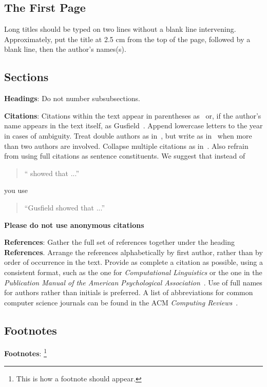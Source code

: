 \documentclass[11pt]{article}
\begin{document}
\subsection{The First Page}
\label{ssec:first}
Long titles should be typed on two lines
without a blank line intervening. Approximately, put the title at 2.5
cm from the top of the page, followed by a blank line, then the
author's names(s).

\subsection{Sections}

{\bf Headings}: Do not number subsubsections.

{\bf Citations}: Citations within the text appear in parentheses
as~\cite{Gusfield:97} or, if the author's name appears in the text
itself, as Gusfield~.  Append lowercase letters
to the year in cases of ambiguity.  Treat double authors as
in~\cite{Aho:72}, but write as in~\cite{Chandra:81} when more than two
authors are involved. Collapse multiple citations as
in~\cite{Gusfield:97,Aho:72}. Also refrain from using full citations
as sentence constituents. We suggest that instead of
\begin{quote}
  ``\cite{Gusfield:97} showed that ...''
\end{quote}
you use
\begin{quote}
``Gusfield    showed that ...''
\end{quote}

\textbf{Please do not use anonymous citations}

\textbf{References}: Gather the full set of references together under
the heading {\bf References}. Arrange the references alphabetically
by first author, rather than by order of occurrence in the text.
Provide as complete a citation as possible, using a consistent format,
such as the one for {\em Computational Linguistics\/} or the one in the
{\em Publication Manual of the American
Psychological Association\/}~\cite{APA:83}. Use of full names for
authors rather than initials is preferred.  A list of abbreviations
for common computer science journals can be found in the ACM
{\em Computing Reviews\/}~\cite{ACM:83}.

\subsection{Footnotes}

{\bf Footnotes}: \footnote{This is how a footnote should appear.}
\end{document}
